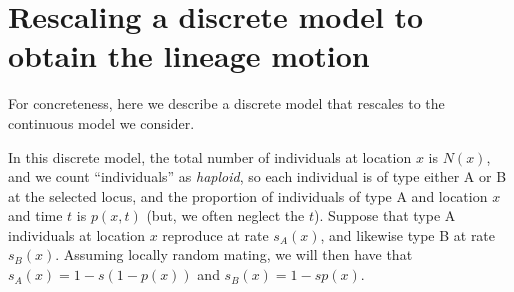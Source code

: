 \documentclass[11pt,letterpaper]{article}
\begin{document}




\appendix
\setcounter{table}{0}
\renewcommand{\thetable}{S\arabic{table}}
\setcounter{figure}{0}
\renewcommand{\thefigure}{S\arabic{figure}}


\section{Rescaling a discrete model to obtain the lineage motion}
\label{apx:lineage_derivation}

For concreteness, here we describe a discrete model that rescales to the continuous model we consider.

In this discrete model, the total number of individuals at location $x$ is $N(x)$,
and we count ``individuals'' as \emph{haploid},
so each individual is of type either A or B at the selected locus,
and the proportion of individuals of type A and location $x$ and time $t$ is $p(x,t)$
(but, we often neglect the $t$).
Suppose that type A individuals at location $x$ reproduce at rate $s_A(x)$, 
and likewise type B at rate $s_B(x)$.
Assuming locally random mating, we will then have that
$s_A(x) = 1 - s (1-p(x))$ and $s_B(x) = 1 - s p(x)$.
\end{document}
